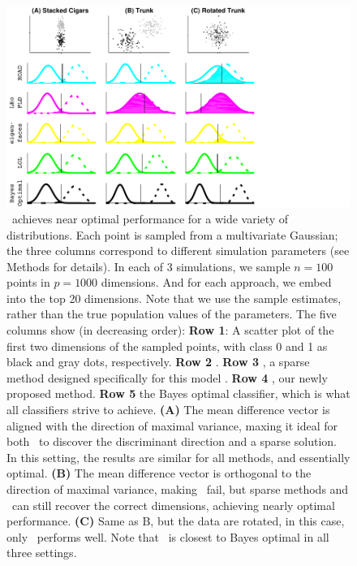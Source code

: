 \documentclass[10pt]{article}
\begin{document}
\begin{figure}%
\centering
\includegraphics[width=0.8\linewidth,trim=0in 0in 1.5in 0in,clip=true]{../Figs/cigars_est.pdf}%
\caption{
\Lol~achieves near optimal performance for a wide variety of distributions.
Each point is sampled from a multivariate Gaussian;
the three columns correspond to different simulation parameters (see Methods for details).
In each of 3 simulations, we sample $n=100$ points in $p=1000$ dimensions.  And for each approach, we embed into the top 20 dimensions. Note that we use the sample estimates, rather than the true population values of the parameters.  The five columns show (in decreasing order):
\textbf{Row 1}: A scatter plot of the first two dimensions of the sampled points, with class 0 and 1 as black and gray dots, respectively.
\textbf{Row 2} .
\textbf{Row 3} \Road, a sparse method designed specifically for this model \cite{Fan2012a}.
\textbf{Row 4} \Lol, our newly proposed method.
\textbf{Row 5} the Bayes optimal classifier, which is what all classifiers strive to achieve.
\textbf{(A)} The mean difference vector is aligned with the direction of maximal variance, maxing it ideal for both \Pca~to discover the discriminant direction and a sparse solution. In this setting, the results are  similar for all methods, and essentially optimal.
\textbf{(B)} The mean difference vector is orthogonal to the direction of maximal variance, making \Pca~fail, but sparse methods and \Lol~can still recover the correct dimensions, achieving nearly optimal performance.
\textbf{(C)} Same as B, but the data are rotated, in this case, only \Lol~performs well.
Note that \Lol~is closest to Bayes optimal in all three settings.
}
\label{f:cigars}
\end{figure}
\end{document}
